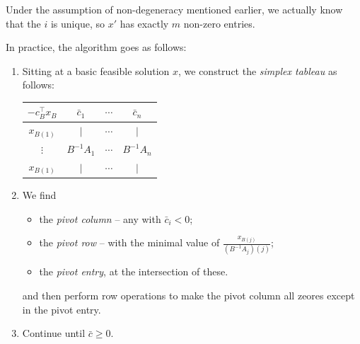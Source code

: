 \documentclass{../template/note}
\begin{document}
    \begin{remark*}
        Under the assumption of non-degeneracy mentioned earlier, we actually know that the $i$ is unique, so $x'$ has exactly $m$ non-zero entries.
    \end{remark*}
    
    In practice, the algorithm goes as follows:
    
    \begin{algorithm}
        \begin{enumerate}[label=\protect\circled{\arabic*}]
            \item Sitting at a basic feasible solution $x$, we construct the \emph{simplex tableau} as follows:
            \begin{center}    
                \begin{tabular}{| c | c c c |}
                    \hline
                    $-c_B^\intercal x_B$ & $\bar c_1$ & $\cdots$ & $\bar c_n$ \\
                    \hline
                    $x_{B(1)}$ & $\mid$ & $\cdots$ & $\mid$ \\
                    $\vdots$ & $B^{-1}A_1$ & $\cdots$ & $B^{-1}A_n$ \\
                    $x_{B(1)}$ & $\mid$ & $\cdots$ & $\mid$ \\
                    \hline
                \end{tabular}        
            \end{center}
            \item We find
            \begin{itemize}
                \item the \emph{pivot column} -- any with $\bar c_i < 0$;
                \item the \emph{pivot row} -- with the minimal value of $\frac{x_{B(j)}}{(B^{-1}A_j)(j)}$;
                \item the \emph{pivot entry}, at the intersection of these.
            \end{itemize}
            and then perform row operations to make the pivot column all zeores except in the pivot entry.
            \item Continue until $\bar c \geq 0$.       
        \end{enumerate}       
    \end{algorithm}
    
\end{document}

